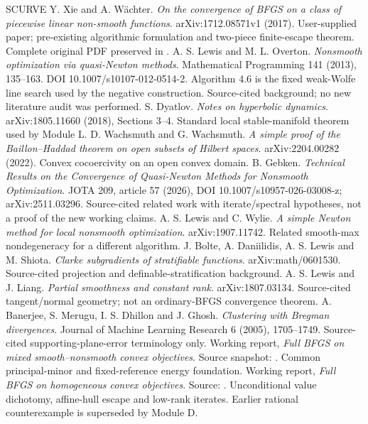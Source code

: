 \documentclass[10pt,oneside,openany]{book}
\theoremstyle{remark}\newtheorem{remark}{Remark}[chapter]
\begin{document}
\begin{thebibliography}{SCURVE}
 Y. Xie and A. W\"achter. \emph{On the convergence of BFGS on a class of piecewise linear non-smooth functions}. arXiv:1712.08571v1 (2017). User-supplied paper; pre-existing algorithmic formulation and two-piece finite-escape theorem. Complete original PDF preserved in .
 A. S. Lewis and M. L. Overton. \emph{Nonsmooth optimization via quasi-Newton methods}. Mathematical Programming 141 (2013), 135--163. DOI 10.1007/s10107-012-0514-2. Algorithm 4.6 is the fixed weak-Wolfe line search used by the negative construction. Source-cited background; no new literature audit was performed.
 S. Dyatlov. \emph{Notes on hyperbolic dynamics}. arXiv:1805.11660 (2018), Sections 3--4. Standard local stable-manifold theorem used by Module L.
 D. Wachsmuth and G. Wachsmuth. \emph{A simple proof of the Baillon--Haddad theorem on open subsets of Hilbert spaces}. arXiv:2204.00282 (2022). Convex cocoercivity on an open convex domain.
 B. Gebken. \emph{Technical Results on the Convergence of Quasi-Newton Methods for Nonsmooth Optimization}. JOTA 209, article 57 (2026), DOI 10.1007/s10957-026-03008-z; arXiv:2511.03296. Source-cited related work with iterate/spectral hypotheses, not a proof of the new working claims.
 A. S. Lewis and C. Wylie. \emph{A simple Newton method for local nonsmooth optimization}. arXiv:1907.11742. Related smooth-max nondegeneracy for a different algorithm.
 J. Bolte, A. Daniilidis, A. S. Lewis and M. Shiota. \emph{Clarke subgradients of stratifiable functions}. arXiv:math/0601530. Source-cited projection and definable-stratification background.
 A. S. Lewis and J. Liang. \emph{Partial smoothness and constant rank}. arXiv:1807.03134. Source-cited tangent/normal geometry; not an ordinary-BFGS convergence theorem.
 A. Banerjee, S. Merugu, I. S. Dhillon and J. Ghosh. \emph{Clustering with Bregman divergences}. Journal of Machine Learning Research 6 (2005), 1705--1749. Source-cited supporting-plane-error terminology only.
 Working report, \emph{Full BFGS on mixed smooth--nonsmooth convex objectives}. Source snapshot: . Common principal-minor and fixed-reference energy foundation.
 Working report, \emph{Full BFGS on homogeneous convex objectives}. Source: . Unconditional value dichotomy, affine-hull escape and low-rank iterates. Earlier rational counterexample is superseded by Module D.

\end{thebibliography}
\end{document}
